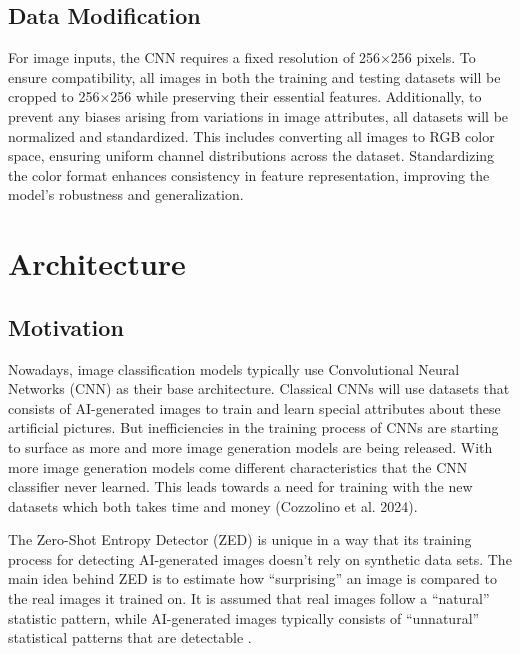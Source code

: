 \documentclass{article} %
\begin{document}
\subsection{Data Modification}
For image inputs, the CNN requires a fixed resolution of 256×256 pixels. To ensure compatibility, all images in both the training and testing datasets will be cropped to 256×256 while preserving their essential features.
Additionally, to prevent any biases arising from variations in image attributes, all datasets will be normalized and standardized. This includes converting all images to RGB color space, ensuring uniform channel distributions across the dataset. Standardizing the color format enhances consistency in feature representation, improving the model's robustness and generalization.

\section{Architecture}
\label{arch}
\subsection{Motivation}

Nowadays, image classification models typically use Convolutional Neural Networks (CNN) as their base architecture. Classical CNNs will use datasets that consists of AI-generated images to train and learn special attributes about these artificial pictures. But inefficiencies in the training process of CNNs are starting to surface as more and more image generation models are being released. With more image generation models come different characteristics that the CNN classifier never learned. This leads towards a need for training with the new datasets which both takes time and money (Cozzolino et al. 2024).


The Zero-Shot Entropy Detector (ZED) is unique in a way that its training process for detecting AI-generated images doesn't rely on synthetic data sets. The main idea behind ZED is to estimate how ``surprising'' an image is compared to the real images it trained on. It is assumed that real images follow a ``natural'' statistic pattern, while AI-generated images typically consists of ``unnatural'' statistical patterns that are detectable \citep{cozzolino2024zeroshotdetectionaigeneratedimages}.
\end{document}
